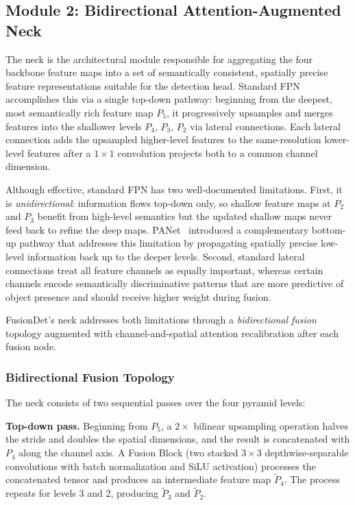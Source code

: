 
\subsection{Module 2: Bidirectional Attention-Augmented Neck}

The neck is the architectural module responsible for aggregating
the four backbone feature maps into a set of semantically
consistent, spatially precise feature representations suitable
for the detection head.  Standard FPN~\cite{lin2017feature}
accomplishes this via a single top-down pathway: beginning from
the deepest, most semantically rich feature map $P_5$, it
progressively upsamples and merges features into the shallower
levels $P_4$, $P_3$, $P_2$ via lateral connections.  Each
lateral connection adds the upsampled higher-level features to
the same-resolution lower-level features after a $1 \times 1$
convolution projects both to a common channel dimension.

Although effective, standard FPN has two well-documented
limitations.  First, it is \textit{unidirectional}: information
flows top-down only, so shallow feature maps at $P_2$ and $P_3$
benefit from high-level semantics but the updated shallow maps
never feed back to refine the deep maps.  PANet~\cite{liu2018path}
introduced a complementary bottom-up pathway that addresses
this limitation by propagating spatially precise low-level
information back up to the deeper levels.  Second, standard
lateral connections treat all feature channels as equally
important, whereas certain channels encode semantically
discriminative patterns that are more predictive of object
presence and should receive higher weight during fusion.

FusionDet's neck addresses both limitations through a
\textit{bidirectional fusion} topology augmented with
channel-and-spatial attention recalibration after each fusion
node.

\subsubsection{Bidirectional Fusion Topology}

The neck consists of two sequential passes over the four
pyramid levels:

\textbf{Top-down pass.}  Beginning from $P_5$, a $2\times$
bilinear upsampling operation halves the stride and doubles the
spatial dimensions, and the result is concatenated with $P_4$
along the channel axis.  A Fusion Block (two stacked
$3\times3$ depthwise-separable convolutions with batch
normalization and SiLU activation) processes the concatenated
tensor and produces an intermediate feature map $\tilde{P}_4$.
The process repeats for levels 3 and 2, producing $\tilde{P}_3$
and $\tilde{P}_2$.


